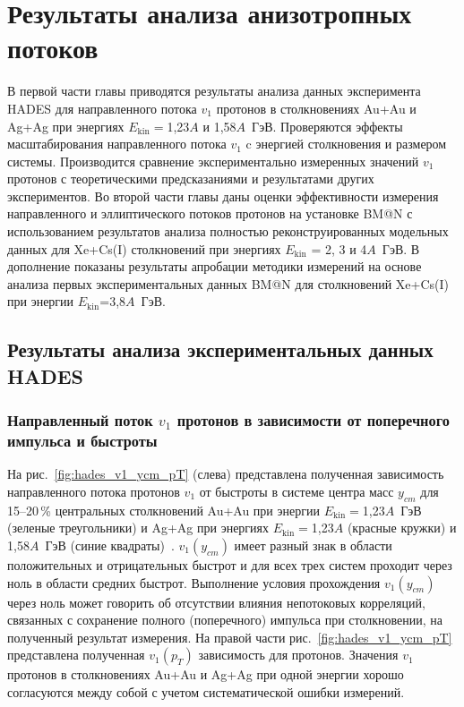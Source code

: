 \chapter{Результаты анализа анизотропных потоков}

В первой части главы приводятся результаты анализа данных эксперимента HADES для 
 направленного потока $v_1$  протонов в    столкновениях Au+Au и Ag+Ag при энергиях $E_{\mathrm{kin}}=$1,23$A$ и 1,58$A$~ГэВ.
Проверяются эффекты масштабирования направленного потока $v_1$ c энергией столкновения и размером системы.
Производится сравнение экспериментально измеренных значений $v_1$ протонов с теоретическими предсказаниями и результатами других экспериментов.
Во второй части главы даны оценки эффективности измерения направленного и эллиптического потоков протонов на установке BM@N с использованием результатов
анализа полностью реконструированных модельных данных  для  Xe+Cs(I) столкновений при энергиях  $E_{\mathrm{kin}}$ = 2, 3 и 4$A$~ГэВ.
В дополнение показаны результаты апробации методики измерений на основе анализа  первых экспериментальных данных
BM@N для столкновений Xe+Cs(I) при энергии $E_{\mathrm{kin}}$=3,8$A$~ГэВ.

\section{Результаты анализа экспериментальных данных HADES}

\subsection{Направленный поток $v_1$ протонов в зависимости от поперечного импульса и быстроты}

На  рис.~\ref{fig:hades_v1_ycm_pT} (слева)  представлена полученная зависимость направленного потока протонов $v_1$ 
от быстроты  в системе центра масс $y_{cm}$ для 15--20\,\% центральных столкновений  
Au+Au при энергии $E_{\mathrm{kin}}=$1,23$A$~ГэВ (зеленые треугольники)  и Ag+Ag при энергиях $E_{\mathrm{kin}}=$1,23$A$ (красные кружки)  и 1,58$A$~ГэВ
(синие квадраты)~\cite{Mamaev:2024-1,Mamaev:2024-2}.
$v_1(y_{cm})$ имеет разный знак в области положительных и отрицательных быстрот и для всех трех систем  проходит через ноль в области средних быстрот.
Выполнение условия прохождения  $v_1(y_{cm})$ через ноль может говорить
 об отсутствии  влияния непотоковых корреляций, связанных с сохранение полного (поперечного) импульса при столкновении, на полученный результат измерения.
 На правой части рис.~\ref{fig:hades_v1_ycm_pT} представлена полученная $v_1(p_{T})$ зависимость для протонов. 
 Значения $v_1$ протонов в столкновениях Au+Au и Ag+Ag при одной энергии хорошо согласуются между собой с учетом систематической ошибки измерений.

